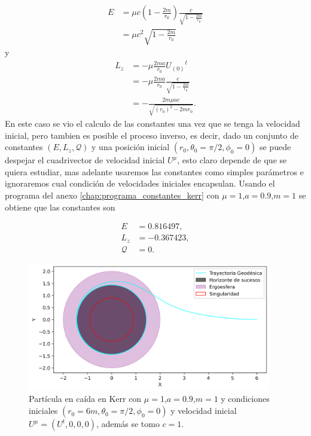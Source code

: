 \begin{equation}
    \begin{aligned}
        E & =  \mu c \left(1-\frac{2 m }{r_0}\right)\frac{c}{\sqrt{1-\frac{2 m }{r_0}}} \\
          & = \mu c^2 \sqrt{1-\frac{2 m }{r_0}}
    \end{aligned}
\end{equation}
y
\begin{equation}
    \begin{aligned}
        L_z & = -\mu \frac{2 m a }{r_0}{U_{(0)}}^t                        \\
            & =-\mu \frac{2 m a}{r_0} \frac{c}{\sqrt{1-\frac{2 m }{r_0}}} \\
            & = -\frac{2 m \mu  a c}{ \sqrt{(r_0)^2-2 m r_0}}.
    \end{aligned}
\end{equation}
En este caso se vio el calculo de las constantes una vez que se tenga la velocidad inicial, pero tambien es posible el proceso inverso, es decir, dado un conjunto de constantes $(E, L_z, \mathcal{Q})$ y una posición inicial $(r_0, \theta_0=\pi/2, \phi_0=0)$ se puede despejar el cuadrivector de velocidad inicial $U^\mu$, esto claro depende de que se quiera estudiar, mas adelante usaremos las constantes como simples parámetros e ignoraremos cual condición de velocidades iniciales encapsulan.
Usando el programa del anexo \ref{chap:programa_constantes_kerr} con $\mu=1$,$a = 0.9$,$m=1$ se obtiene que las constantes son

\begin{align*}
E& = 0.816497 ,\\
 L_z& =  -0.367423, \\ 
 \mathcal{Q} &= 0.
\end{align*}

\begin{figure}[H]
    \begin{small}
        \begin{center}
            \includegraphics[width=0.95\textwidth]{AgujerosNegros/kerr/geodesics_plots/Geodesica_caida_planoxy.png}
        \end{center}
        \caption{Partícula en caída en Kerr con $\mu=1$,$a = 0.9$,$m=1$ y condiciones iniciales $(r_0=6m, \theta_0=\pi/2, \phi_0=0)$ y velocidad inicial $U^\mu = (U^t, 0, 0, 0 )$, además se tomo $c=1$.}
    \end{small}
\end{figure}

